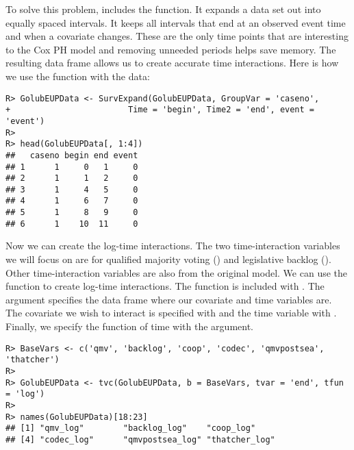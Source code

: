 \documentclass[nojss]{jss}\usepackage[]{graphicx}\usepackage[]{color}
\makeatletter
\newenvironment{kframe}{%
 \def\at@end@of@kframe{}%
 \ifinner\ifhmode%
  \def\at@end@of@kframe{\end{minipage}}%
  \begin{minipage}{\columnwidth}%
 \fi\fi%
 \def\FrameCommand##1{\hskip\@totalleftmargin \hskip-\fboxsep
 \colorbox{shadecolor}{##1}\hskip-\fboxsep
     \hskip-\linewidth \hskip-\@totalleftmargin \hskip\columnwidth}%
 \MakeFramed {\advance\hsize-\width
   \@totalleftmargin\z@ \linewidth\hsize
   \@setminipage}}%
 {\par\unskip\endMakeFramed%
 \at@end@of@kframe}
\newenvironment{knitrout}{}{} %
\makeatother
\begin{document}
To solve this problem,  includes the  function. It expands a data set out into equally spaced intervals. It keeps all intervals that end at an observed event time and when a covariate changes. These are the only time points that are interesting to the Cox PH model and removing unneeded periods helps save memory. The resulting data frame allows us to create accurate time interactions. Here is how we use the function with the  data:

\begin{knitrout}
\color{fgcolor}\begin{kframe}
\begin{verbatim}
R> GolubEUPData <- SurvExpand(GolubEUPData, GroupVar = 'caseno',
+                        Time = 'begin', Time2 = 'end', event = 'event')
R> 
R> head(GolubEUPData[, 1:4])
##   caseno begin end event
## 1      1     0   1     0
## 2      1     1   2     0
## 3      1     4   5     0
## 4      1     6   7     0
## 5      1     8   9     0
## 6      1    10  11     0
\end{verbatim}
\end{kframe}
\end{knitrout}

Now we can create the log-time interactions. The two time-interaction variables we will focus on are for qualified majority voting () and legislative backlog (). Other time-interaction variables are also from the original model. We can use the  function to create log-time interactions. The function is included with . The  argument specifies the data frame where our covariate and time variables are. The covariate we wish to interact is specified with  and the time variable with . Finally, we specify the function of time with the  argument.

\begin{knitrout}
\color{fgcolor}\begin{kframe}
\begin{verbatim}
R> BaseVars <- c('qmv', 'backlog', 'coop', 'codec', 'qmvpostsea', 'thatcher')
R> 
R> GolubEUPData <- tvc(GolubEUPData, b = BaseVars, tvar = 'end', tfun = 'log')
R> 
R> names(GolubEUPData)[18:23]
## [1] "qmv_log"        "backlog_log"    "coop_log"      
## [4] "codec_log"      "qmvpostsea_log" "thatcher_log"
\end{verbatim}
\end{kframe}
\end{knitrout}
\end{document}
